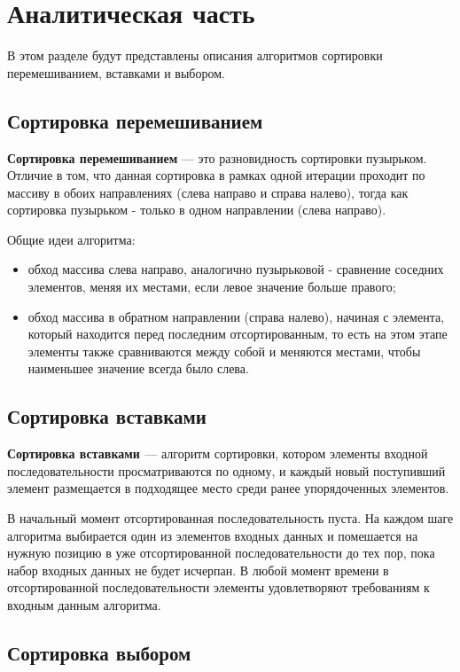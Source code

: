 \chapter{Аналитическая часть}
В этом разделе будут представлены описания алгоритмов сортировки перемешиванием, вставками и выбором.

\section{Сортировка перемешиванием}

\textbf{Сортировка перемешиванием} \cite{sheyker} — это разновидность сортировки пузырьком. Отличие в том, что данная сортировка в рамках одной итерации проходит по массиву в обоих направлениях (слева направо и справа налево), тогда как сортировка пузырьком - только в одном направлении (слева направо).

Общие идеи алгоритма:
\begin{itemize}
	\item обход массива слева направо, аналогично пузырьковой - сравнение соседних элементов, меняя их местами, если левое значение больше правого;
	\item обход массива в обратном направлении (справа налево), начиная с элемента, который находится перед последним отсортированным, то есть на этом этапе элементы также сравниваются между собой и меняются местами, чтобы наименьшее значение всегда было слева.
\end{itemize}


\section{Сортировка вставками}

\textbf{Сортировка вставками \cite{insert}} — алгоритм сортировки, котором элементы входной последовательности просматриваются по одному, и каждый новый поступивший элемент размещается в подходящее место среди ранее упорядоченных элементов.

В начальный момент отсортированная последовательность пуста. На
каждом шаге алгоритма выбирается один из элементов входных данных и помешается на нужную позицию в уже отсортированной последовательности до тех пор, пока набор входных данных не будет исчерпан. В любой момент времени в отсортированной последовательности элементы удовлетворяют требованиям к входным данным алгоритма.

\section{Сортировка выбором}


